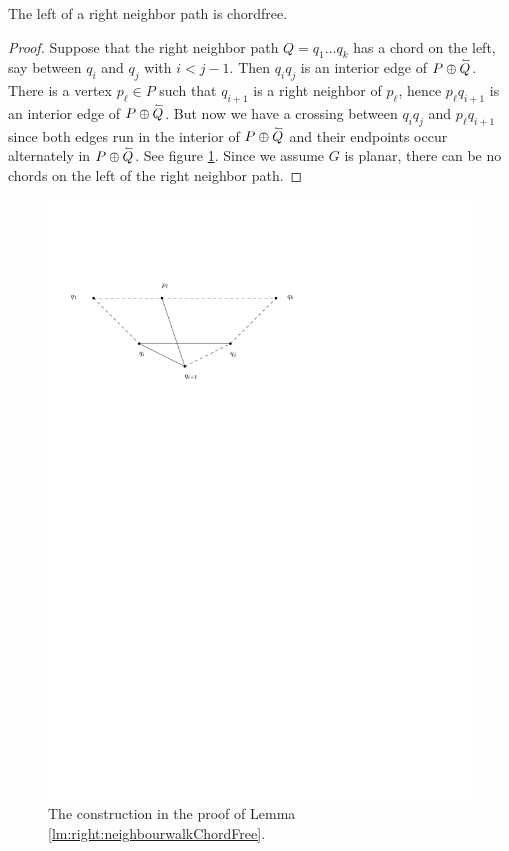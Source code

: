     \begin{lemma}
      \label{lm:right:neighbourwalkChordFree}
      The left of a right neighbor path is chordfree.
    \end{lemma}
    \begin{proof}
      Suppose that the right neighbor path $Q = q_1 \ldots q_k$  has a chord on the left, say between $q_i$ and $q_j$ with $i< j -1 $. Then $q_i q_j$ is an interior edge of $P \oplus \accentset{\leftharpoonup}{Q}$.  There is a vertex $p_\ell \in P$ such that $q_{i+1}$ is a right neighbor of $p_\ell$, hence $p_\ell q_{i+1}$ is an interior edge of $P \oplus \accentset{\leftharpoonup}{Q}$.
      But now we have a crossing between $q_i q_j$ and $p_\ell q_{i+1}$ since both edges run in the interior of $P \oplus \accentset{\leftharpoonup}{Q}$ and their endpoints occur alternately in $P \oplus \accentset{\leftharpoonup}{Q}$.
      See figure \ref{fig:uni:neihbourwalkChordFree}.
      Since we assume $G$ is planar, there can be no chords on the left of the right neighbor path.
    \end{proof}

    \quad
    \quad
      \begin{figure}[h]
        \centering
        \includegraphics[scale=1]{unifiedAlgo/img/rightNeighbourwalk/neighbourWalkChords}
        \caption{The construction in the proof of Lemma \ref{lm:right:neighbourwalkChordFree}.}
        \label{fig:uni:neihbourwalkChordFree}
      \end{figure}

